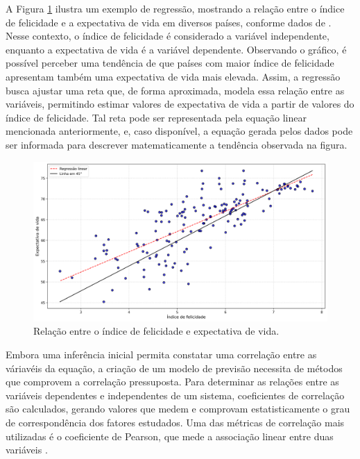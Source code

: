 A Figura \ref{fig:regressao_exemplo} ilustra um exemplo de regressão, mostrando a relação entre o índice de felicidade e a expectativa de vida em diversos países, conforme dados de \cite{helliwell2020}. Nesse contexto, o índice de felicidade é considerado a variável independente, enquanto a expectativa de vida é a variável dependente. Observando o gráfico, é possível perceber uma tendência de que países com maior índice de felicidade apresentam também uma expectativa de vida mais elevada. Assim, a regressão busca ajustar uma reta que, de forma aproximada, modela essa relação entre as variáveis, permitindo estimar valores de expectativa de vida a partir de valores do índice de felicidade. Tal reta pode ser representada pela equação linear mencionada anteriormente, e, caso disponível, a equação gerada pelos dados pode ser informada para descrever matematicamente a tendência observada na figura.

\begin{figure}[H]
	\caption{\label{fig:regressao_exemplo}Relação entre o índice de felicidade e expectativa de vida.}
	\begin{center}
		\includegraphics[scale=0.4]{figuras/happiness_world.png}
	\end{center}
\end{figure}

Embora uma inferência inicial permita constatar uma correlação entre as váriavéis da equação, a criação de um modelo de previsão necessita de métodos que comprovem a correlação pressuposta. Para determinar as relações entre as variáveis dependentes e independentes de um sistema, coeficientes de correlação são calculados, gerando valores que medem e comprovam estatisticamente o grau de correspondência dos fatores estudados. Uma das métricas de correlação mais utilizadas é o coeficiente de Pearson, que mede a associação linear entre duas variáveis \cite{kirch2008}. 

